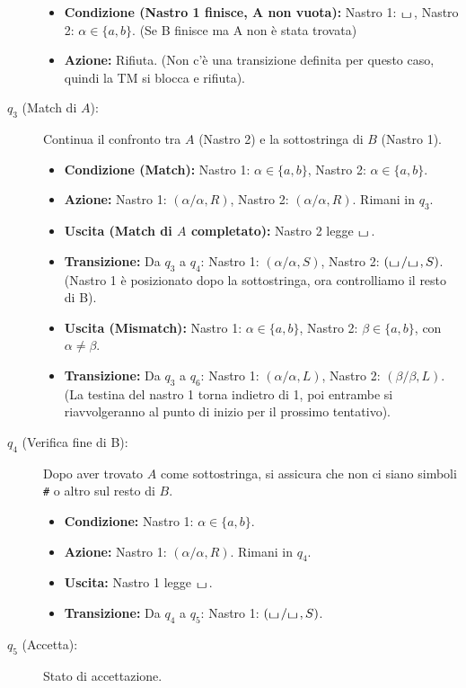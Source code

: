 \documentclass[a4paper]{article}
\theoremstyle{definition} %
\newcommand{\blankS}{\ensuremath{\raisebox{-0.15ex}{\scalebox{1.3}[0.7]{$\sqcup$}}\mkern2mu}}
\begin{document}
\begin{description}
\begin{itemize}
        \item \textbf{Condizione (Nastro 1 finisce, A non vuota):} Nastro 1: $\blankS$, Nastro 2: $\alpha \in \{a,b\}$. (Se B finisce ma A non è stata trovata)
        \item \textbf{Azione:} Rifiuta. (Non c'è una transizione definita per questo caso, quindi la TM si blocca e rifiuta).
    \end{itemize}
    \item[$q_3$ (Match di $A$):] Continua il confronto tra $A$ (Nastro 2) e la sottostringa di $B$ (Nastro 1).
    \begin{itemize}
        \item \textbf{Condizione (Match):} Nastro 1: $\alpha \in \{a,b\}$, Nastro 2: $\alpha \in \{a,b\}$.
        \item \textbf{Azione:} Nastro 1: $(\alpha/\alpha, R)$, Nastro 2: $(\alpha/\alpha, R)$. Rimani in $q_3$.
        \item \textbf{Uscita (Match di $A$ completato):} Nastro 2 legge $\blankS$.
        \item \textbf{Transizione:} Da $q_3$ a $q_4$: Nastro 1: $(\alpha/\alpha, S)$, Nastro 2: $(\blankS/\blankS, S)$. (Nastro 1 è posizionato dopo la sottostringa, ora controlliamo il resto di B).
        \item \textbf{Uscita (Mismatch):} Nastro 1: $\alpha \in \{a,b\}$, Nastro 2: $\beta \in \{a,b\}$, con $\alpha \ne \beta$.
        \item \textbf{Transizione:} Da $q_3$ a $q_6$: Nastro 1: $(\alpha/\alpha, L)$, Nastro 2: $(\beta/\beta, L)$. (La testina del nastro 1 torna indietro di 1, poi entrambe si riavvolgeranno al punto di inizio per il prossimo tentativo).
    \end{itemize}
    \item[$q_4$ (Verifica fine di B):] Dopo aver trovato $A$ come sottostringa, si assicura che non ci siano simboli \texttt{\#} o altro sul resto di $B$.
    \begin{itemize}
        \item \textbf{Condizione:} Nastro 1: $\alpha \in \{a,b\}$.
        \item \textbf{Azione:} Nastro 1: $(\alpha/\alpha, R)$. Rimani in $q_4$.
        \item \textbf{Uscita:} Nastro 1 legge $\blankS$.
        \item \textbf{Transizione:} Da $q_4$ a $q_5$: Nastro 1: $(\blankS/\blankS, S)$.
    \end{itemize}
    \item[$q_5$ (Accetta):] Stato di accettazione.

\end{description}
\end{document}
